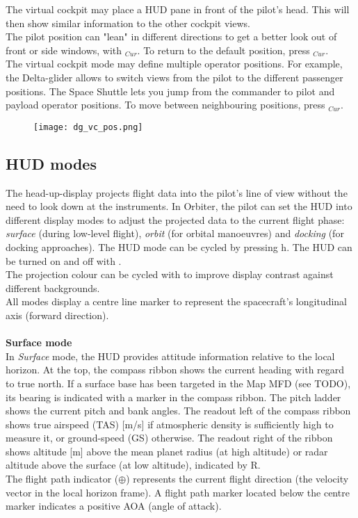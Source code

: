 \documentclass[Orbiter User Manual.tex]{subfiles}
\begin{document}
\noindent
The virtual cockpit may place a HUD pane in front of the pilot's head. This will then show similar information to the other cockpit views.\\
The pilot position can "lean" in different directions to get a better look out of front or side windows, with \Ctrl\Alt\UArrow\RArrow\LArrow$_{Cur}$. To return to the default position, press \Ctrl\Alt\DArrow$_{Cur}$.\\
The virtual cockpit mode may define multiple operator positions. For example, the Delta-glider allows to switch views from the pilot to the different passenger positions. The Space Shuttle lets you jump from the commander to pilot and payload operator positions. To move between neighbouring positions, press \Ctrl\UArrow\DArrow\RArrow\LArrow$_{Cur}$.

\begin{figure}[H]
  \centering
  \texttt{[image: dg\_vc\_pos.png]}
\end{figure}


\subsection{HUD modes}
The head-up-display projects flight data into the pilot's line of view without the need to look down at the instruments. In Orbiter, the pilot can set the HUD into different display modes to adjust the projected data to the current flight phase: \textit{surface} (during low-level flight), \textit{orbit} (for orbital manoeuvres) and \textit{docking} (for docking approaches). The HUD mode can be cycled by pressing h. The HUD can be turned on and off with \Ctrl{}.\\
The projection colour can be cycled with \Alt{} to improve display contrast against different backgrounds.\\
All modes display a centre line marker to represent the spacecraft's longitudinal axis (forward direction).\\
\\
\textbf{Surface mode}\\
In \textit{Surface} mode, the HUD provides attitude information relative to the local horizon. At the top, the compass ribbon shows the current heading with regard to true north. If a surface base has been targeted in the Map MFD (see TODO), its bearing is indicated with a marker in the compass ribbon. The pitch ladder shows the current pitch and bank angles. The readout left of the compass ribbon shows true airspeed (TAS) [m/s] if atmospheric density is sufficiently high to measure it, or ground-speed (GS) otherwise. The readout right of the ribbon shows altitude [m] above the mean planet radius (at high altitude) or radar altitude above the surface (at low altitude), indicated by R.\\
The flight path indicator ($\oplus$) represents the current flight direction (the velocity vector in the local horizon frame). A flight path marker located below the centre marker indicates a positive AOA (angle of attack).
\end{document}
